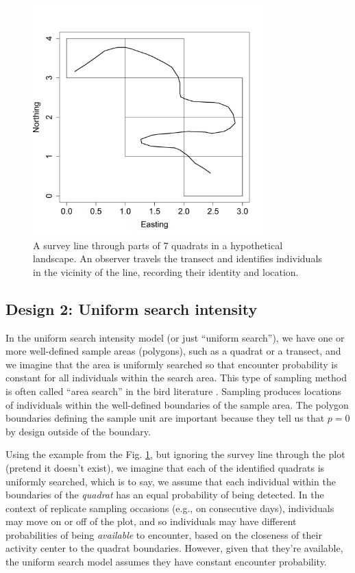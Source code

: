 \begin{figure}
\centering
\includegraphics[width=3.5in,height=3.5in]{Ch15-searchencounter/figs/snakeline.png}
\caption{
A survey line through parts of 7 quadrats in a
  hypothetical landscape. An observer travels the transect and
  identifies individuals in the vicinity of the line, recording their
  identity and location.
}
\label{searchencounter.fig.snakeline}
\end{figure}


\subsection{Design 2: Uniform search intensity}

In the uniform search intensity model (or just ``uniform search''), we
have one or more well-defined sample areas (polygons), such as a
quadrat or a transect, and we imagine that the area is uniformly
searched so that encounter probability is constant for all individuals
within the search area.  This type of sampling method is often called
``area search'' in the bird literature \citep{bibby_etal:1992}.
Sampling produces locations of individuals within the well-defined
boundaries of the sample area. The polygon boundaries defining the
sample unit are important because they tell us that $p=0$ by design
outside of the boundary.

Using the example from the Fig. \ref{searchencounter.fig.snakeline},
but ignoring the survey line through the plot (pretend it doesn't
exist), we imagine that each of the identified quadrats is uniformly
searched, which is to say, we assume that each individual within the
boundaries of the {\it quadrat} has an equal probability of being
detected.  In the context of replicate sampling occasions (e.g., on
consecutive days), individuals may move on or off of the plot, and so
individuals may have different probabilities of being {\it available}
to encounter, based on the closeness of their activity center to the
quadrat boundaries. However, given that they're available, the uniform
search model assumes they have constant encounter probability.

